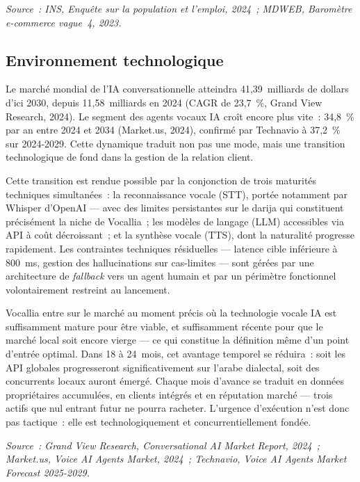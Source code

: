 \textit{Source~: INS, Enquête sur la population et l'emploi, 2024~; MDWEB, Baromètre e-commerce vague~4, 2023.}

\subsection{Environnement technologique}
\label{section2.1.4}

Le marché mondial de l'IA conversationnelle atteindra 41,39~milliards de dollars d'ici 2030, depuis 11,58~milliards en 2024 (CAGR de 23,7~\%, Grand View Research, 2024). Le segment des agents vocaux IA croît encore plus vite~: 34,8~\% par an entre 2024 et 2034 (Market.us, 2024), confirmé par Technavio à 37,2~\% sur 2024-2029. Cette dynamique traduit non pas une mode, mais une transition technologique de fond dans la gestion de la relation client.

Cette transition est rendue possible par la conjonction de trois maturités techniques simultanées~: la reconnaissance vocale (STT), portée notamment par Whisper d'OpenAI --- avec des limites persistantes sur le darija qui constituent précisément la niche de Vocallia~; les modèles de langage (LLM) accessibles via API à coût décroissant~; et la synthèse vocale (TTS), dont la naturalité progresse rapidement. Les contraintes techniques résiduelles --- latence cible inférieure à 800~ms, gestion des hallucinations sur cas-limites --- sont gérées par une architecture de \emph{fallback} vers un agent humain et par un périmètre fonctionnel volontairement restreint au lancement.

Vocallia entre sur le marché au moment précis où la technologie vocale IA est suffisamment mature pour être viable, et suffisamment récente pour que le marché local soit encore vierge --- ce qui constitue la définition même d'un point d'entrée optimal. Dans 18 à 24~mois, cet avantage temporel se réduira~: soit les API globales progresseront significativement sur l'arabe dialectal, soit des concurrents locaux auront émergé. Chaque mois d'avance se traduit en données propriétaires accumulées, en clients intégrés et en réputation marché --- trois actifs que nul entrant futur ne pourra racheter. L'urgence d'exécution n'est donc pas tactique~: elle est technologiquement et concurrentiellement fondée.

\textit{Source~: Grand View Research, Conversational AI Market Report, 2024~; Market.us, Voice AI Agents Market, 2024~; Technavio, Voice AI Agents Market Forecast 2025-2029.}

